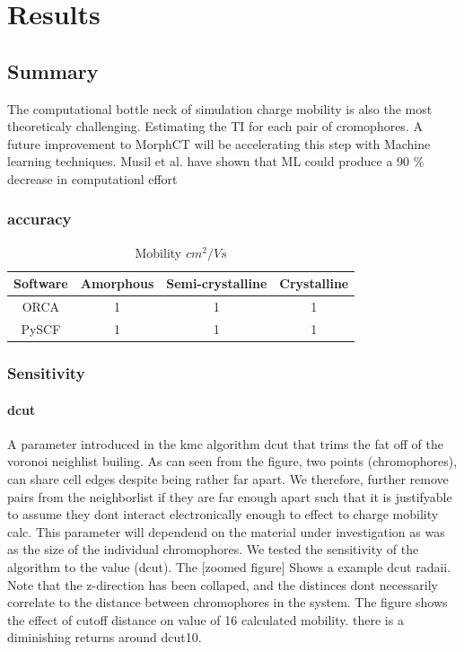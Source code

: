 \chapter{Results}
\label{chap:results}

\section{Summary}

\indent The computational bottle neck of simulation charge mobility is also the most theoreticaly challenging.
Estimating the TI for each pair of cromophores. A future improvement to MorphCT will be accelerating this step
with Machine learning techniques. Musil et al. have shown that ML could produce a 90 \% decrease in
computationl effort \cite{Musil2018}
\subsection{accuracy}

\begin{table}[ht]
    \caption{Mobility $cm^{2}/Vs$} %
\centering %
\begin{tabular}{c c c c} %
\hline\hline %
Software & Amorphous & Semi-crystalline & Crystalline \\ [0.5ex] %
\hline %
ORCA & 1 & 1 & 1 \\ %
PySCF & 1 & 1 & 1 \\ [1ex] %
\hline %
\end{tabular}
\label{table:nonlin} %
\end{table}

\subsection{Sensitivity}

\subsubsection{dcut}

A parameter introduced in the kmc algorithm dcut that trims the fat off of the voronoi neighlist builing.
As can seen from the figure, two points (chromophores), can share cell edges despite being rather far apart. We
therefore, further remove pairs from the neighborlist if they are far enough apart such that it is justifyable
to assume they dont interact electronically enough to effect to charge mobility calc. This parameter will
dependend on the material under investigation as was as the size of the individual chromophores. We tested the
sensitivity of the algorithm to the value (dcut). The [zoomed figure] Shows a example dcut radaii. Note that
the z-direction has been collaped, and the distinces dont necessarily correlate to the distance
between chromophores in the system. The figure shows the effect of cutoff distance on value of
16 calculated mobility. there is a diminishing returns around dcut10.


